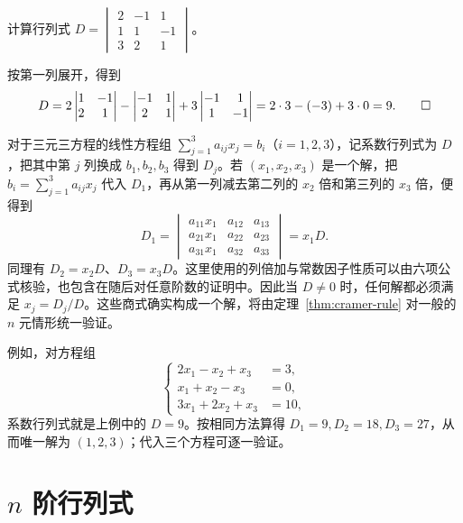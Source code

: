\begin{example}
计算行列式 $D=\begin{vmatrix}2&-1&1\\1&1&-1\\3&2&1\end{vmatrix}$。
\end{example}
\begin{solve}
按第一列展开，得到
\[
    D=2\begin{vmatrix}1&-1\\2&1\end{vmatrix}
      -\begin{vmatrix}-1&1\\2&1\end{vmatrix}
      +3\begin{vmatrix}-1&1\\1&-1\end{vmatrix}
     =2\cdot3-(-3)+3\cdot0=9.\qedhere
\]
\end{solve}

对于三元三方程的线性方程组 $\sum_{j=1}^{3}a_{ij}x_j=b_i$（$i=1,2,3$），记系数行列式为 $D$，把其中第 $j$ 列换成 $b_1,b_2,b_3$ 得到 $D_j$。若 $(x_1,x_2,x_3)$ 是一个解，把 $b_i=\sum_{j=1}^{3}a_{ij}x_j$ 代入 $D_1$，再从第一列减去第二列的 $x_2$ 倍和第三列的 $x_3$ 倍，便得到
\[
    D_1=\begin{vmatrix}
        a_{11}x_1&a_{12}&a_{13}\\
        a_{21}x_1&a_{22}&a_{23}\\
        a_{31}x_1&a_{32}&a_{33}
    \end{vmatrix}=x_1D.
\]
同理有 $D_2=x_2D$、$D_3=x_3D$。这里使用的列倍加与常数因子性质可以由六项公式核验，也包含在随后对任意阶数的证明中。因此当 $D\ne0$ 时，任何解都必须满足 $x_j=D_j/D$。这些商式确实构成一个解，将由定理~\ref{thm:cramer-rule} 对一般的 $n$ 元情形统一验证。

例如，对方程组
\[
    \left\{\begin{aligned}
        2x_1-x_2+x_3&=3,\\
        x_1+x_2-x_3&=0,\\
        3x_1+2x_2+x_3&=10,
    \end{aligned}\right.
\]
系数行列式就是上例中的 $D=9$。按相同方法算得 $D_1=9,D_2=18,D_3=27$，从而唯一解为 $(1,2,3)$；代入三个方程可逐一验证。

\section{\texorpdfstring{$n$}{n} 阶行列式}
\label{sec:determinant-order-n}

